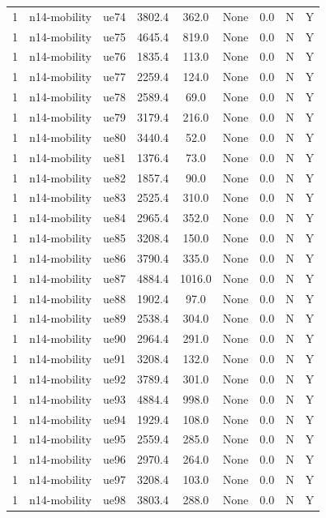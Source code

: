 \begin{table}[ht]
\begin{tabular}{|c|c|c|c|c|c|c|c|c|}
1 & n14-mobility & ue74 & 3802.4 & 362.0 & None & 0.0 & N & Y \\
1 & n14-mobility & ue75 & 4645.4 & 819.0 & None & 0.0 & N & Y \\
1 & n14-mobility & ue76 & 1835.4 & 113.0 & None & 0.0 & N & Y \\
1 & n14-mobility & ue77 & 2259.4 & 124.0 & None & 0.0 & N & Y \\
1 & n14-mobility & ue78 & 2589.4 & 69.0 & None & 0.0 & N & Y \\
1 & n14-mobility & ue79 & 3179.4 & 216.0 & None & 0.0 & N & Y \\
1 & n14-mobility & ue80 & 3440.4 & 52.0 & None & 0.0 & N & Y \\
1 & n14-mobility & ue81 & 1376.4 & 73.0 & None & 0.0 & N & Y \\
1 & n14-mobility & ue82 & 1857.4 & 90.0 & None & 0.0 & N & Y \\
1 & n14-mobility & ue83 & 2525.4 & 310.0 & None & 0.0 & N & Y \\
1 & n14-mobility & ue84 & 2965.4 & 352.0 & None & 0.0 & N & Y \\
1 & n14-mobility & ue85 & 3208.4 & 150.0 & None & 0.0 & N & Y \\
1 & n14-mobility & ue86 & 3790.4 & 335.0 & None & 0.0 & N & Y \\
1 & n14-mobility & ue87 & 4884.4 & 1016.0 & None & 0.0 & N & Y \\
1 & n14-mobility & ue88 & 1902.4 & 97.0 & None & 0.0 & N & Y \\
1 & n14-mobility & ue89 & 2538.4 & 304.0 & None & 0.0 & N & Y \\
1 & n14-mobility & ue90 & 2964.4 & 291.0 & None & 0.0 & N & Y \\
1 & n14-mobility & ue91 & 3208.4 & 132.0 & None & 0.0 & N & Y \\
1 & n14-mobility & ue92 & 3789.4 & 301.0 & None & 0.0 & N & Y \\
1 & n14-mobility & ue93 & 4884.4 & 998.0 & None & 0.0 & N & Y \\
1 & n14-mobility & ue94 & 1929.4 & 108.0 & None & 0.0 & N & Y \\
1 & n14-mobility & ue95 & 2559.4 & 285.0 & None & 0.0 & N & Y \\
1 & n14-mobility & ue96 & 2970.4 & 264.0 & None & 0.0 & N & Y \\
1 & n14-mobility & ue97 & 3208.4 & 103.0 & None & 0.0 & N & Y \\
1 & n14-mobility & ue98 & 3803.4 & 288.0 & None & 0.0 & N & Y \\

\end{tabular}
\end{table}
